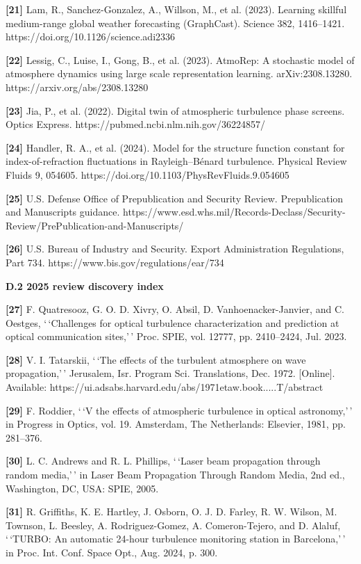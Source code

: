 \documentclass[
]{article}
\begin{document}
\textbf{{[}21{]}} Lam, R., Sanchez-Gonzalez, A., Willson, M., et al.
(2023). Learning skillful medium-range global weather forecasting
(GraphCast). Science 382, 1416--1421.
https://doi.org/10.1126/science.adi2336

\textbf{{[}22{]}} Lessig, C., Luise, I., Gong, B., et al. (2023).
AtmoRep: A stochastic model of atmosphere dynamics using large scale
representation learning. arXiv:2308.13280.
https://arxiv.org/abs/2308.13280

\textbf{{[}23{]}} Jia, P., et al. (2022). Digital twin of atmospheric
turbulence phase screens. Optics Express.
https://pubmed.ncbi.nlm.nih.gov/36224857/

\textbf{{[}24{]}} Handler, R. A., et al. (2024). Model for the structure
function constant for index-of-refraction fluctuations in
Rayleigh--Bénard turbulence. Physical Review Fluids 9, 054605.
https://doi.org/10.1103/PhysRevFluids.9.054605

\textbf{{[}25{]}} U.S. Defense Office of Prepublication and Security
Review. Prepublication and Manuscripts guidance.
https://www.esd.whs.mil/Records-Declass/Security-Review/PrePublication-and-Manuscripts/

\textbf{{[}26{]}} U.S. Bureau of Industry and Security. Export
Administration Regulations, Part 734.
https://www.bis.gov/regulations/ear/734

\textbf{D.2 2025 review discovery index}

\textbf{{[}27{]}} F. Quatresooz, G. O. D. Xivry, O. Absil, D.
Vanhoenacker-Janvier, and C. Oestges, `\,`Challenges for optical
turbulence characterization and prediction at optical communication
sites,'\,' Proc. SPIE, vol. 12777, pp. 2410--2424, Jul. 2023.

\textbf{{[}28{]}} V. I. Tatarskii, `\,`The effects of the turbulent
atmosphere on wave propagation,'\,' Jerusalem, Isr. Program Sci.
Translations, Dec. 1972. {[}Online{]}. Available:
https://ui.adsabs.harvard.edu/abs/1971etaw.book.....T/abstract

\textbf{{[}29{]}} F. Roddier, `\,`V the effects of atmospheric
turbulence in optical astronomy,'\,' in Progress in Optics, vol. 19.
Amsterdam, The Netherlands: Elsevier, 1981, pp. 281--376.

\textbf{{[}30{]}} L. C. Andrews and R. L. Phillips, `\,`Laser beam
propagation through random media,'\,' in Laser Beam Propagation Through
Random Media, 2nd ed., Washington, DC, USA: SPIE, 2005.

\textbf{{[}31{]}} R. Griffiths, K. E. Hartley, J. Osborn, O. J. D.
Farley, R. W. Wilson, M. Townson, L. Beesley, A. Rodriguez-Gomez, A.
Comeron-Tejero, and D. Alaluf, `\,`TURBO: An automatic 24-hour
turbulence monitoring station in Barcelona,'\,' in Proc. Int. Conf.
Space Opt., Aug. 2024, p. 300.
\end{document}
